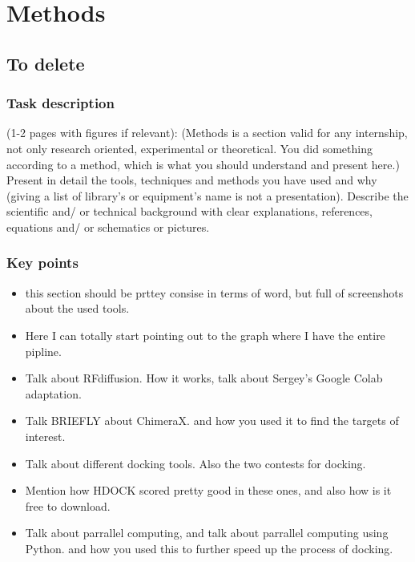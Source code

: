 \documentclass[11pt,a4paper]{article}
\begin{document}
\section{Methods}

\subsection{To delete}

\subsubsection{Task description}
(1-2 pages with figures if relevant): (Methods is a section valid for any internship, not only research oriented, experimental or theoretical. You did something according to a method, which is what you should understand and present here.)
Present in detail the tools, techniques and methods you have used and why (giving a list of library's or equipment's name is not a presentation). 
Describe the scientific and/ or technical background with clear explanations, references, equations and/ or schematics or pictures. 

\subsubsection{Key points}

\begin{itemize}
    \item this section should be prttey consise in terms of word, but 
    full of screenshots about the used tools.
    \item Here I can totally start pointing out to the graph where I 
    have the entire pipline.
    \item Talk about RFdiffusion. How it works, talk about Sergey's 
    Google Colab adaptation.
    \item Talk BRIEFLY about ChimeraX. and how you used it to find the 
    targets of interest.
    \item Talk about different docking tools. Also the two contests for 
    docking.
    \item Mention how HDOCK scored pretty good in these ones, and also 
    how is it free to download.
    \item Talk about parrallel computing, and talk about parrallel 
    computing using Python. and how you used this to further speed up 
    the process of docking.
\end{itemize}
\end{document}
